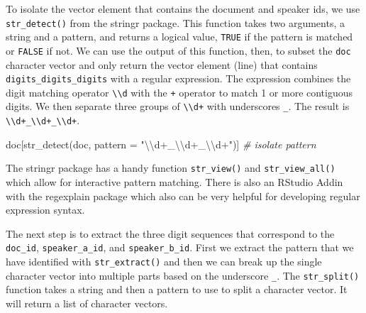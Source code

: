 \documentclass[
  letterpaper,
  DIV=11,
  numbers=noendperiod]{scrreport}
\newenvironment{Shaded}{\begin{snugshade}}{\end{snugshade}}
\newcommand{\AttributeTok}[1]{\textcolor[rgb]{0.00,0.00,0.00}{#1}}
\newcommand{\CommentTok}[1]{\textcolor[rgb]{0.00,0.00,0.00}{\textit{#1}}}
\newcommand{\FunctionTok}[1]{\textcolor[rgb]{0.00,0.00,0.00}{#1}}
\newcommand{\NormalTok}[1]{\textcolor[rgb]{0.00,0.00,0.00}{#1}}
\newcommand{\SpecialCharTok}[1]{\textcolor[rgb]{0.00,0.00,0.00}{#1}}
\newcommand{\StringTok}[1]{\textcolor[rgb]{0.00,0.00,0.00}{#1}}
\theoremstyle{definition}
\theoremstyle{remark}
\begin{document}
To isolate the vector element that contains the document and speaker
ids, we use \texttt{str\_detect()} from the stringr package. This
function takes two arguments, a string and a pattern, and returns a
logical value, \texttt{TRUE} if the pattern is matched or \texttt{FALSE}
if not. We can use the output of this function, then, to subset the
\texttt{doc} character vector and only return the vector element (line)
that contains \texttt{digits\_digits\_digits} with a regular expression.
The expression combines the digit matching operator
\texttt{\textbackslash{}\textbackslash{}d} with the \texttt{+} operator
to match 1 or more contiguous digits. We then separate three groups of
\texttt{\textbackslash{}\textbackslash{}d+} with underscores
\texttt{\_}. The result is
\texttt{\textbackslash{}\textbackslash{}d+\_\textbackslash{}\textbackslash{}d+\_\textbackslash{}\textbackslash{}d+}.

\begin{Shaded}
\begin{Highlighting}[]
\NormalTok{doc[}\FunctionTok{str\_detect}\NormalTok{(doc, }\AttributeTok{pattern =} \StringTok{"}\SpecialCharTok{\textbackslash{}\textbackslash{}}\StringTok{d+\_}\SpecialCharTok{\textbackslash{}\textbackslash{}}\StringTok{d+\_}\SpecialCharTok{\textbackslash{}\textbackslash{}}\StringTok{d+"}\NormalTok{)] }\CommentTok{\# isolate pattern}
\end{Highlighting}
\end{Shaded}

\begin{tcolorbox}[enhanced jigsaw, breakable, arc=.35mm, opacityback=0, bottomrule=.15mm, colback=white, opacitybacktitle=0.6, colframe=quarto-callout-warning-color-frame, toptitle=1mm, colbacktitle=quarto-callout-warning-color!10!white, left=2mm, leftrule=.75mm, toprule=.15mm, title=\textcolor{quarto-callout-warning-color}{\faExclamationTriangle}\hspace{0.5em}{Tip}, bottomtitle=1mm, coltitle=black, titlerule=0mm, rightrule=.15mm]

The stringr package has a handy function \texttt{str\_view()} and
\texttt{str\_view\_all()} which allow for interactive pattern matching.
There is also an RStudio Addin with the regexplain package which also
can be very helpful for developing regular expression syntax.

\end{tcolorbox}

The next step is to extract the three digit sequences that correspond to
the \texttt{doc\_id}, \texttt{speaker\_a\_id}, and
\texttt{speaker\_b\_id}. First we extract the pattern that we have
identified with \texttt{str\_extract()} and then we can break up the
single character vector into multiple parts based on the underscore
\texttt{\_}. The \texttt{str\_split()} function takes a string and then
a pattern to use to split a character vector. It will return a list of
character vectors.
\end{document}
